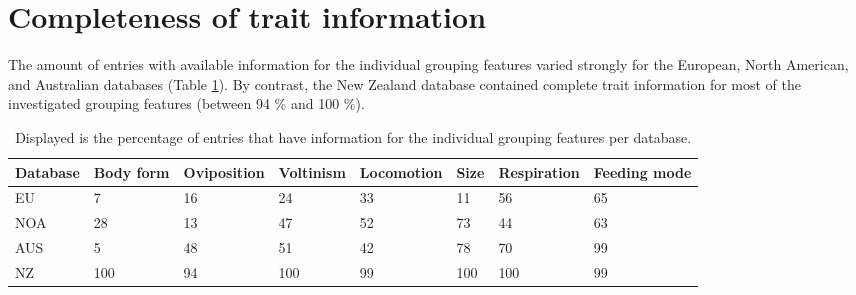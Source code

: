 \documentclass[../Draft_harmonization_paper.tex]{subfiles}
\begin{document}
\newpage

\section{Completeness of trait information}

The amount of entries with available information for the individual grouping features varied strongly for the European, North American, and Australian databases (Table \ref{tab:trait_coverage}). By contrast, the New Zealand database contained complete trait information for most of the investigated grouping features (between 94 \% and 100 \%).

\begin{table}[ht]
    \centering
    \caption{Displayed is the percentage of entries that have information for the individual grouping features per database.} 
    \label{tab:trait_coverage}
    \begin{tabular}{llllllll}
    \hline
    Database & Body form & Oviposition & Voltinism & Locomotion & Size & Respiration & Feeding mode \\ 
    \hline
    EU & 7 & 16 & 24 & 33 & 11 & 56 & 65 \\ 
    NOA & 28 & 13 & 47 & 52 & 73 & 44 & 63 \\ 
    AUS & 5 & 48 & 51 & 42 & 78 & 70 & 99 \\ 
    NZ & 100 & 94 & 100 & 99 & 100 & 100 & 99 \\ 
    \hline
    \end{tabular}
    \end{table}
\end{document}
